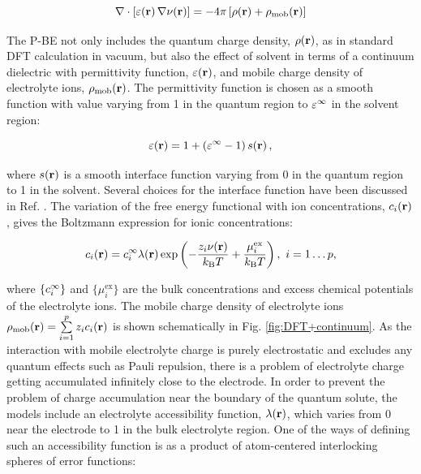\documentclass[../main.tex]{subfiles}
\begin{document}
\begin{equation}
    \label{eq:pbe}
    \nabla\cdot\left[\varepsilon\!\left(\mathbf{r}\right)\nabla\nu\!\left(\mathbf{r}\right)\right]=-4\pi\left[\rho\!\left(\mathbf{r}\right)+\rho_{\textrm{mob}}\!\left(\mathbf{r}\right)\right]
\end{equation}

The P-BE not only includes the quantum charge density, $\rho\!\left(\mathbf{r}\right)$, as in standard DFT calculation in vacuum, but also the effect of solvent in terms of a continuum dielectric with permittivity function, $\varepsilon\!\left(\mathbf{r}\right)$, and mobile charge density of electrolyte ions, $\rho_{\textrm{mob}}\!\left(\mathbf{r}\right)$. The permittivity function is chosen as a smooth function with value varying from 1 in the quantum region to $\varepsilon^\infty$ in the solvent region:\cite{Nattino2019}

\begin{equation}
    \varepsilon\!\left(\mathbf{r}\right)=1+\left(\varepsilon^\infty-1\right)s\!\left(\mathbf{r}\right),
\end{equation}

where $s\!\left(\mathbf{r}\right)$ is a smooth interface function varying from 0 in the quantum region to 1 in the solvent. Several choices for the interface function have been discussed in Ref. . The variation of the free energy functional with ion concentrations, $c_i\!\left(\mathbf{r}\right)$, gives the Boltzmann expression for ionic concentrations:

\begin{equation}
    \label{eq:cig}
    \ci\ofrvec = \cif\lambda(\mathbf{r}) \exp \left(-\frac{z_i\nu(\mathbf{r})}{k_{\textrm{B}} T} +\frac{\mu_i^\textrm{ex}}{k_{\textrm{B}} T} \right), \ i=1\dots{}p,
\end{equation}

where $\{c_i^{\infty}\}$ and $\{\mu_i^\textrm{ex}\}$ are the bulk concentrations and excess chemical potentials of the electrolyte ions. The mobile charge density of electrolyte ions $\rho_{\textrm{mob}}\!\left(\mathbf{r}\right)=\sum\limits_{i=1}^p z_ic_i\!\left(\mathbf{r}\right)$ is shown schematically in Fig. \ref{fig:DFT+continuum}. As the interaction with mobile electrolyte charge is purely electrostatic and excludes any quantum effects such as Pauli repulsion, there is a problem of electrolyte charge getting accumulated infinitely close to the electrode. In order to prevent the problem of charge accumulation near the boundary of the quantum solute, the models include an electrolyte accessibility function, $\lambda\!\left(\mathbf{r}\right)$, which varies from 0 near the electrode to 1 in the bulk electrolyte region.\cite{Fisicaro2017, Sundararaman2018, Stein2019} One of the ways of defining such an accessibility function is as a product of atom-centered interlocking spheres of error functions:\cite{Dziedzic2020}
\end{document}
